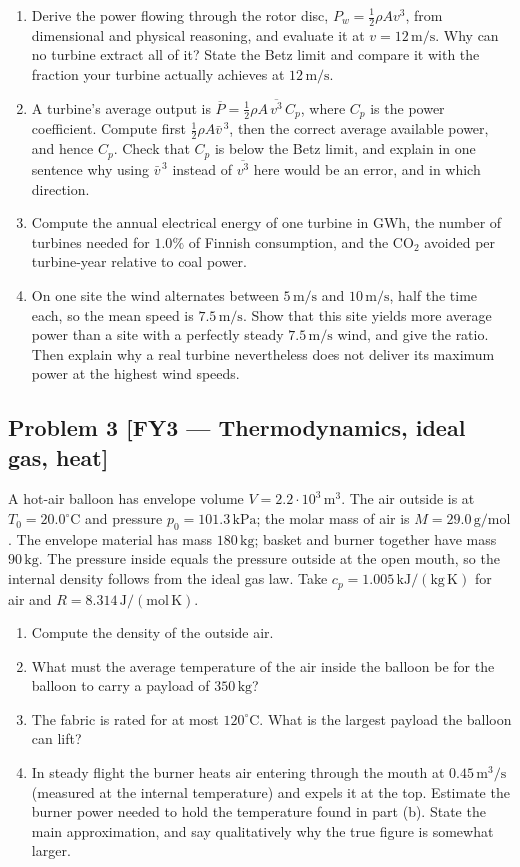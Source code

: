 \documentclass[11pt,a4paper]{article}
\newcommand{\problem}[3]{%
  \subsection*{Problem #1 \;\textnormal{\small[#2]}}\label{prob:#3}%
}
\newcommand{\unit}[1]{\,\mathrm{#1}}
\newenvironment{parts}{\begin{enumerate}[label=\textbf{\alph*)}]}{\end{enumerate}}
\begin{document}
\begin{parts}
\item Derive the power flowing through the rotor disc,
      $P_w=\tfrac12\rho A v^3$, from dimensional and physical reasoning, and
      evaluate it at $v=12\unit{m/s}$. Why can no turbine extract all of it?
      State the Betz limit and compare it with the fraction your turbine
      actually achieves at $12\unit{m/s}$.
\item A turbine's average output is
      $\overline{P}=\tfrac12\rho A\,\overline{v^3}\,C_p$, where $C_p$ is the
      power coefficient. Compute first $\tfrac12\rho A\bar v^{\,3}$, then the
      correct average available power, and hence $C_p$. Check that $C_p$ is
      below the Betz limit, and explain in one sentence why using
      $\bar v^{\,3}$ instead of $\overline{v^3}$ here would be an error, and
      in which direction.
\item Compute the annual electrical energy of one turbine in GWh, the number
      of turbines needed for $1.0\%$ of Finnish consumption, and the CO$_2$
      avoided per turbine-year relative to coal power.
\item On one site the wind alternates between $5\unit{m/s}$ and
      $10\unit{m/s}$, half the time each, so the mean speed is
      $7.5\unit{m/s}$. Show that this site yields more average power than a
      site with a perfectly steady $7.5\unit{m/s}$ wind, and give the ratio.
      Then explain why a real turbine nevertheless does not deliver its
      maximum power at the highest wind speeds.
\end{parts}

\problem{3}{FY3 --- Thermodynamics, ideal gas, heat}{fy3}

A hot-air balloon has envelope volume $V=2.2\cdot10^{3}\unit{m^3}$. The air
outside is at $T_0=20.0^\circ$C and pressure $p_0=101.3\unit{kPa}$; the molar
mass of air is $M=29.0\unit{g/mol}$. The envelope material has mass
$180\unit{kg}$; basket and burner together have mass $90\unit{kg}$. The
pressure inside equals the pressure outside at the open mouth, so the internal
density follows from the ideal gas law. Take $c_p=1.005\unit{kJ/(kg\,K)}$ for
air and $R=8.314\unit{J/(mol\,K)}$.

\begin{parts}
\item Compute the density of the outside air.
\item What must the average temperature of the air inside the balloon be for
      the balloon to carry a payload of $350\unit{kg}$?
\item The fabric is rated for at most $120^\circ$C. What is the largest
      payload the balloon can lift?
\item In steady flight the burner heats air entering through the mouth at
      $0.45\unit{m^3/s}$ (measured at the internal temperature) and expels it
      at the top. Estimate the burner power needed to hold the temperature
      found in part (b). State the main approximation, and say qualitatively
      why the true figure is somewhat larger.
\end{parts}
\end{document}
